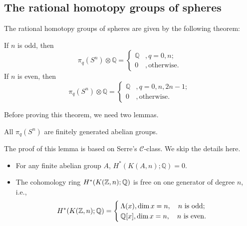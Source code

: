     \subsection{The rational homotopy groups of spheres}
    The rational homotopy groups of spheres are given by the following theorem:
    \begin{theorem}
        If $n$ is odd, then
        \begin{equation*}
            \pi_q(S^n)\otimes\mathbb{Q} =
            \begin{cases}
                \mathbb{Q} &, q=0, n; \\
                0 &, \text{otherwise}.
            \end{cases}
        \end{equation*}
        If $n$ is even, then
        \begin{equation*}
            \pi_q(S^n)\otimes\mathbb{Q} =
            \begin{cases}
                \mathbb{Q} &, q=0, n, 2n-1; \\
                0 &, \text{otherwise}.
            \end{cases}
        \end{equation*}
    \end{theorem} 
    Before proving this theorem, we need two lemmas. 
    \begin{lemma}
        All $\pi_q(S^n)$ are finitely generated abelian groups.
    \end{lemma}
    The proof of this lemma is based on Serre's 
    $\mathscr{C}$-class. We skip the details here. 
    \begin{lemma}\label{coho-of-EMspace}\hfill
        \begin{itemize}
            \item For any finite abelian group $A$, $H^*(K(A,n);\mathbb{Q})=0$.
            \item The cohomology ring $H^*(K(\mathbb{Z},n);\mathbb{Q})$ is free on one 
            generator of degree $n$, i.e., 
            \begin{equation*}
                H^*(K(\mathbb{Z},n);\mathbb{Q}) =
                \begin{cases}
                    \Lambda(x), \dim x=n,\quad n \rm{\ is\ odd }; \\
                    \mathbb{Q}[x], \dim x=n,\quad n \rm{\ is\ even }.
                \end{cases}
            \end{equation*}
        \end{itemize}
    \end{lemma}
